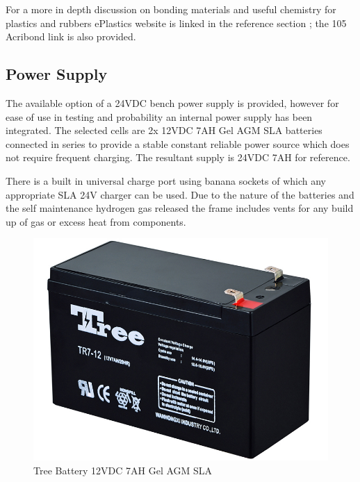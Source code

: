 \documentclass[a4paper, 10pt]{IEEEconf}
\begin{document}
For a more in depth discussion on bonding materials and useful chemistry for plastics and rubbers ePlastics website is linked in the reference section \cite{ePlastic}; the 105 Acribond link \cite{105} is also provided.


\subsection{Power Supply}

The available option of a 24VDC bench power supply is provided, however for ease of use in testing and probability an internal power supply has been integrated. The selected cells are 2x 12VDC 7AH Gel AGM SLA batteries connected in series to provide a stable constant reliable power source which does not require frequent charging. The resultant supply is 24VDC 7AH for reference. 

There is a built in universal charge port using banana sockets of which any appropriate SLA 24V charger can be used. Due to the nature of the batteries and the self maintenance hydrogen gas released the frame includes vents for any build up of gas or excess heat from components.

\begin{figure}[H]
  \includegraphics[width=\linewidth]{images/Battery}
  \caption{Tree Battery 12VDC 7AH Gel AGM SLA}
  \label{fig:Basic stripped frame before population}
\end{figure}

\end{document}
